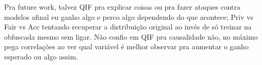 \documentclass{article}
\begin{document}
{\color{red} Pra future work, talvez QIF pra explicar coisas ou pra fazer ataques contra modelos afinal eu ganho algo e perco algo dependendo do que acontece; Priv vs Fair vs Acc tentando recuperar a distribuição original ao invés de só treinar na obfuscada mesmo sem ligar. Não confio em QIF pra causalidade não, no máximo pega correlações ao ver qual variável é melhor observar pra aumentar o ganho esperado ou algo assim.}




\end{document}

